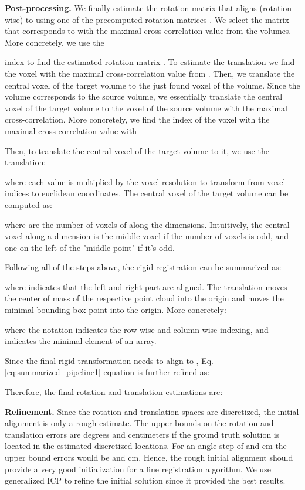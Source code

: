 \documentclass{bmvc2k}
\begin{document}
\textbf{Post-processing.} \label{sec:post-processing} We finally estimate the rotation matrix  that aligns (rotation-wise)  to  using one of the  precomputed rotation matrices . We select the matrix  that corresponds to  with the maximal cross-correlation value from the  volumes. More concretely, we use the

index to find the estimated rotation matrix .
To estimate the translation we find the voxel with the maximal cross-correlation value from . Then, we translate the central voxel of the target volume to the just found voxel of the  volume. Since the  volume corresponds to the source  volume, we essentially translate the central voxel of the target volume to the voxel of the source volume with the maximal cross-correlation. More concretely, we find the index of the voxel with the maximal cross-correlation value with

Then, to translate the central voxel of the target volume to it, we use the translation:

where each value is multiplied by the voxel resolution  to transform from voxel indices to euclidean coordinates. The central voxel of the target volume can be computed as:

where  are the number of voxels of  along the  dimensions. Intuitively, the central voxel along a dimension is the middle voxel if the number of voxels is odd, and one on the left of the "middle point" if it's odd.


Following all of the steps above, the rigid registration can be summarized as:

where  indicates that the left and right part are aligned. The  translation moves the center of mass of the respective point cloud into the origin and  moves the minimal bounding box point into the origin. More concretely:



where the  notation indicates the row-wise and column-wise indexing, and  indicates the minimal element of an array.

Since the final rigid transformation needs to align  to , Eq. \ref{eq:summarized_pipeline1} equation is further refined as:


Therefore, the final rotation and translation estimations are:



\textbf{Refinement.} Since the rotation and translation spaces are discretized, the initial alignment is only a rough estimate. The upper bounds on the rotation and translation errors are  degrees and  centimeters if the ground truth solution is located in the estimated discretized locations. For an angle step of  and cm the upper bound errors would be  and cm. Hence, the rough initial alignment should provide a very good initialization for a fine registration algorithm. 
We use generalized ICP \cite{generalized-icp} to refine the initial solution since it provided the best results.
\end{document}
